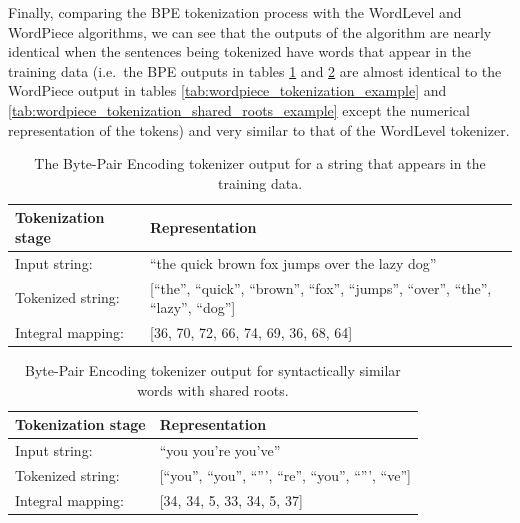 \documentclass[12pt]{article}
\begin{document}
Finally, comparing the BPE tokenization process with the WordLevel and WordPiece algorithms, we can see that the outputs of the algorithm are nearly
identical when the sentences being tokenized have words that appear in the training data (i.e.~the BPE outputs in tables
\ref{tab:bpe_tokenization_example} and \ref{tab:bpe_shared_roots_example} are almost identical to the WordPiece output in tables
\ref{tab:wordpiece_tokenization_example} and \ref{tab:wordpiece_tokenization_shared_roots_example} except the numerical representation of the tokens)
and very similar to that of the WordLevel tokenizer.

\begin{table}[!t]
    \centering
    \begin{tabular}{l l}
        \toprule
        Tokenization stage & Representation                                                                            \\
        \midrule
        Input string:      & ``the quick brown fox jumps over the lazy dog''                                           \\
        Tokenized string:  & [``the'', ``quick'', ``brown'', ``fox'', ``jumps'', ``over'', ``the'', ``lazy'', ``dog''] \\
        Integral mapping:  & [36, 70, 72, 66, 74, 69, 36, 68, 64]                                                      \\
        \bottomrule
    \end{tabular}
    \caption{The Byte-Pair Encoding tokenizer output for a string that appears in the training data.}
    \label{tab:bpe_tokenization_example}
\end{table}

\begin{table}[!t]
    \centering
    \begin{tabular}{l l}
        \toprule
        Tokenization stage & Representation                                            \\
        \midrule
        Input string:      & ``you you're you've''                                     \\
        Tokenized string:  & [``you'', ``you'', ``''', ``re'', ``you'', ``''', ``ve''] \\
        Integral mapping:  & [34, 34, 5, 33, 34, 5, 37]                                \\
        \bottomrule
    \end{tabular}
    \caption{Byte-Pair Encoding tokenizer output for syntactically similar words with shared roots.}
    \label{tab:bpe_shared_roots_example}
\end{table}
\end{document}

